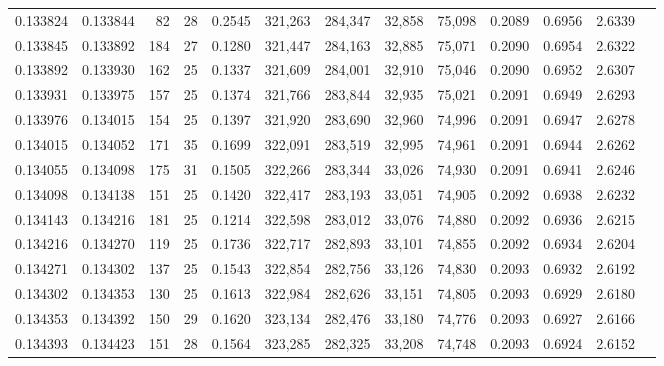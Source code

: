 \begin{tabular}{rrrrrrrrrrrrr}
0.133824 & 0.133844 &  82 &  28 &                                     0.2545 & 321,263 & 284,347 &  32,858 &  75,098 & 0.2089 & 0.6956 & 2.6339 \\
0.133845 & 0.133892 & 184 &  27 &                                     0.1280 & 321,447 & 284,163 &  32,885 &  75,071 & 0.2090 & 0.6954 & 2.6322 \\
0.133892 & 0.133930 & 162 &  25 &                                     0.1337 & 321,609 & 284,001 &  32,910 &  75,046 & 0.2090 & 0.6952 & 2.6307 \\
0.133931 & 0.133975 & 157 &  25 &                                     0.1374 & 321,766 & 283,844 &  32,935 &  75,021 & 0.2091 & 0.6949 & 2.6293 \\
0.133976 & 0.134015 & 154 &  25 &                                     0.1397 & 321,920 & 283,690 &  32,960 &  74,996 & 0.2091 & 0.6947 & 2.6278 \\
0.134015 & 0.134052 & 171 &  35 &                                     0.1699 & 322,091 & 283,519 &  32,995 &  74,961 & 0.2091 & 0.6944 & 2.6262 \\
0.134055 & 0.134098 & 175 &  31 &                                     0.1505 & 322,266 & 283,344 &  33,026 &  74,930 & 0.2091 & 0.6941 & 2.6246 \\
0.134098 & 0.134138 & 151 &  25 &                                     0.1420 & 322,417 & 283,193 &  33,051 &  74,905 & 0.2092 & 0.6938 & 2.6232 \\
0.134143 & 0.134216 & 181 &  25 &                                     0.1214 & 322,598 & 283,012 &  33,076 &  74,880 & 0.2092 & 0.6936 & 2.6215 \\
0.134216 & 0.134270 & 119 &  25 &                                     0.1736 & 322,717 & 282,893 &  33,101 &  74,855 & 0.2092 & 0.6934 & 2.6204 \\
0.134271 & 0.134302 & 137 &  25 &                                     0.1543 & 322,854 & 282,756 &  33,126 &  74,830 & 0.2093 & 0.6932 & 2.6192 \\
0.134302 & 0.134353 & 130 &  25 &                                     0.1613 & 322,984 & 282,626 &  33,151 &  74,805 & 0.2093 & 0.6929 & 2.6180 \\
0.134353 & 0.134392 & 150 &  29 &                                     0.1620 & 323,134 & 282,476 &  33,180 &  74,776 & 0.2093 & 0.6927 & 2.6166 \\
0.134393 & 0.134423 & 151 &  28 &                                     0.1564 & 323,285 & 282,325 &  33,208 &  74,748 & 0.2093 & 0.6924 & 2.6152 \\

\end{tabular}
